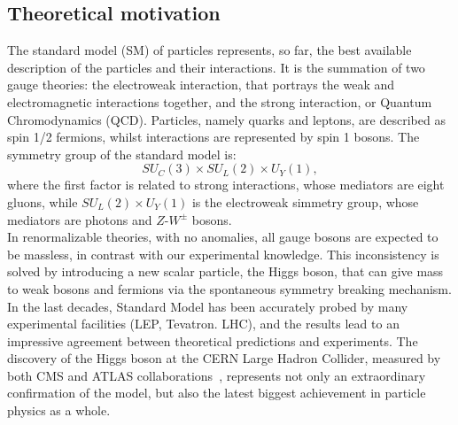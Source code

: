\begin{tcolorbox}[breakable,colback=black!5!white,colframe=red!80!black,width=\textwidth]
\chapter{Theoretical motivation}
\end{tcolorbox}
\label{chap:theory}

The standard model (SM) of particles represents, so far, the best available description of the particles and their interactions. It is the summation of two gauge theories: the electroweak interaction, that portrays the weak and electromagnetic interactions together, and the strong interaction, or Quantum Chromodynamics (QCD). Particles, namely quarks and leptons, are described as spin 1/2 fermions, whilst interactions are represented by spin 1 bosons. The symmetry group of the standard model is:
\begin{equation}
SU_{C}(3) \times SU_L (2) \times U_Y (1),
\end{equation}
\label{eq:theory_SMgroup}
where the first factor is related to strong interactions, whose mediators are eight gluons, while $SU_L (2) \times U_Y (1)$ is the electroweak simmetry group, whose mediators are photons and $Z$-$W^{\pm}$ bosons.\\
In renormalizable theories, with no anomalies, all gauge bosons are expected to be massless, in contrast with our experimental knowledge. This inconsistency is solved by introducing a new scalar particle, the Higgs boson, that can give mass to weak bosons and fermions via the spontaneous symmetry breaking mechanism.
\\

In the last decades, Standard Model has been accurately probed by many experimental facilities (LEP, Tevatron. LHC), and the results lead to an impressive agreement between theoretical predictions and experiments. The discovery of the Higgs boson at the CERN Large Hadron Collider, measured by both CMS and ATLAS collaborations~\cite{bib:Aad20121,bib:Chatrchyan201230,bib:Chatrchyan2013lba,Aad:2013xqa,Khachatryan:2014jba,Aad:2014aba,Aad:2015zhl}, represents not only an extraordinary confirmation of the model, but also the latest biggest achievement in particle physics as a whole.

